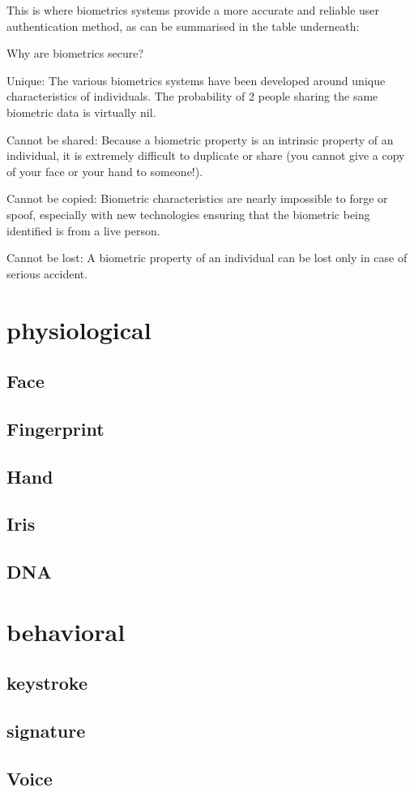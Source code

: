 \documentclass [12pt]{book}
\begin{document}
This is where biometrics systems provide a more accurate and reliable user authentication method, as can be summarised in the table underneath:


Why are biometrics secure?


Unique: The various biometrics systems have been developed around unique characteristics of individuals. The probability of 2 people sharing the same biometric data is virtually nil.

Cannot be shared: Because a biometric property is an intrinsic property of an individual, it is extremely difficult to duplicate or share (you cannot give a copy of your face or your hand to someone!).

Cannot be copied: Biometric characteristics are nearly impossible to forge or spoof, especially with new technologies ensuring that the biometric being identified is from a live person.

Cannot be lost: A biometric property of an individual can be lost only in case of serious accident.
	
	
	\chapter{physiological}
	
	\section{Face}
	
	\section{Fingerprint}
	
	\section{Hand}
	\section{Iris}
	\section{DNA}
	\chapter{behavioral}
	\section{keystroke}
	\section{signature}
    \section{Voice}
    
    
  
\end{document}
